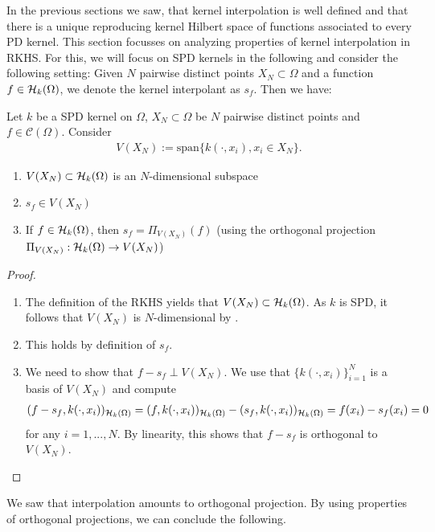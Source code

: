In the previous sections we saw,
that kernel interpolation is well defined and that there is a unique reproducing kernel Hilbert space of functions associated to every PD kernel.
This section focusses on analyzing properties of kernel interpolation in RKHS.
For this, we will focus on SPD kernels in the following and consider the following setting:
Given $N$ pairwise distinct points $X_N \subset \Omega$ and a function $f \in \mathcal H_k (\Omega)$, 
we denote the kernel interpolant as $s_f$.
Then we have:


\begin{prop}
\label{prop:interpolation_projection}
Let $k$ be a SPD kernel on $\Omega$, $X_N \subset \Omega$ be $N$ pairwise distinct points and $f \in \mathcal{C}(\Omega)$. 
Consider 
\begin{align*}
V(X_N) := \mathrm{span}\{ k(\cdot, x_i), x_i \in X_N \}.
\end{align*}
\begin{enumerate}
\item $V(X_N) \subset \mathcal H_k (\Omega)$ is an $N$-dimensional subspace
\item $s_f \in V(X_N)$
\item If $f \in \mathcal H_k (\Omega)$, then $s_f = \Pi_{V(X_N)}(f)$ (using the orthogonal projection $\Pi_{V(X_N)}: \mathcal H_k (\Omega) \rightarrow V(X_N)$) 
\end{enumerate}
\end{prop}

\begin{proof}
\begin{enumerate}
\item The definition of the RKHS yields that $V(X_N) \subset \mathcal H_k (\Omega)$.
As $k$ is SPD, it follows that $V(X_N)$ is $N$-dimensional by .
\item This holds by definition of $s_f$.
\item We need to show that $f - s_f \perp V(X_N)$. 
We use that $\{ k(\cdot, x_i) \}_{i=1}^N$ is a basis of $V(X_N)$ and compute
\begin{align}
\label{eq:orthogonality_f_sf}
(f-s_f, k(\cdot, x_i))_{\mathcal H_k (\Omega)} = (f, k(\cdot, x_i))_{\mathcal H_k (\Omega)} - (s_f, k(\cdot, x_i))_{\mathcal H_k (\Omega)} = f(x_i) - s_f(x_i) = 0
\end{align}
for any $i=1, ..., N$.
By linearity, this shows that $f-s_f$ is orthogonal to $V(X_N)$.
\end{enumerate}
\end{proof}

We saw that interpolation amounts to orthogonal projection.
By using properties of orthogonal projections, we can conclude the following.

